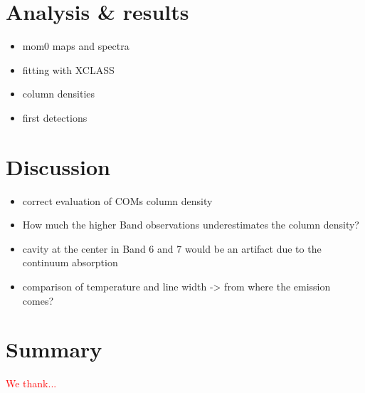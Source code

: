 \documentclass[linenumbers, twocolumn, times]{aastex631}
\begin{document}
\section{Analysis \& results} \label{sec:analysis}
\begin{itemize}
    \item mom0 maps and spectra
    \item fitting with XCLASS
    \item column densities
    \item first detections
\end{itemize}

\section{Discussion} \label{sec:discussion}
\begin{itemize}
    \item correct evaluation of COMs column density
    \item How much the higher Band observations underestimates the column density?
    \item cavity at the center in Band 6 and 7 would be an artifact due to the continuum absorption
    \item comparison of temperature and line width -> from where the emission comes?
\end{itemize}

\section{Summary} \label{sec:summary}


\begin{acknowledgments}
\textcolor{red}{We thank...}
\end{acknowledgments}

%

\vspace{5mm}
\facilities{\textcolor{red}{facilities used here}}
\end{document}
